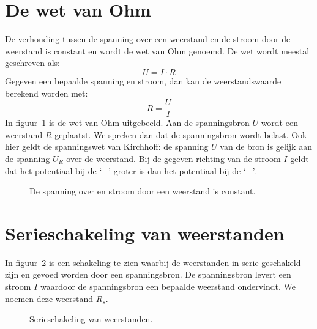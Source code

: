 \section{De wet van Ohm}
De verhouding tussen de spanning over een weerstand en de stroom door de weerstand is constant
en wordt de wet van Ohm genoemd. De wet wordt meestal geschreven als:
\begin{equation}
U=I\cdot R
\end{equation}
%
Gegeven een bepaalde spanning en stroom, dan kan de weerstandswaarde berekend worden met:
%
\begin{equation}
R = \dfrac{U}{I}
\end{equation}
%
In figuur~\ref{fig:geldewetvanohm} is de wet van Ohm uitgebeeld. Aan de spanningsbron $U$ wordt
een weerstand $R$ geplaatst. We spreken dan dat de spanningsbron wordt belast. Ook hier geldt de
spanningswet van Kirchhoff: de spanning $U$ van de bron is gelijk aan de spanning $U_R$ over de
weerstand. Bij de gegeven richting van de stroom $I$ geldt dat het potentiaal bij de `$+$' groter
is dan het potentiaal bij de `$-$'.

\begin{figure}[!ht]
\centering
{}
\caption{De spanning over en stroom door een weerstand is constant.}
\label{fig:geldewetvanohm}
\end{figure}

\section{Serieschakeling van weerstanden}
In figuur~\ref{fig:gelserieschakelingweerstanden} is een schakeling te zien waarbij de weerstanden
in serie geschakeld zijn en gevoed worden door een spanningsbron. De spanningsbron levert een stroom
$I$ waardoor de spanningsbron een bepaalde weerstand ondervindt. We noemen deze weerstand $R_s$.

\begin{figure}[!ht]
\centering
{}
\caption{Serieschakeling van weerstanden.}
\label{fig:gelserieschakelingweerstanden}
\end{figure}

